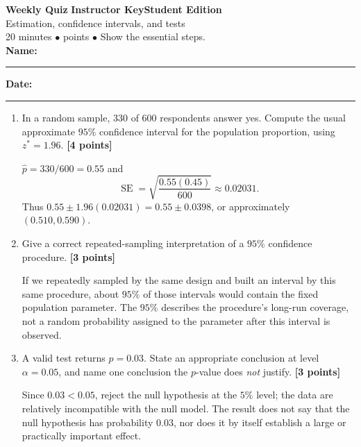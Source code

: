 \documentclass[11pt]{article}
\newcounter{quiznum}
\newcommand{\edition}{\ifanswers Instructor Key\else Student Edition\fi}
\newcommand{\points}[1]{\hfill{\small\color{rose}\textbf{[#1 points]}}}
\newcommand{\quizheading}[1]{%
  \clearpage\stepcounter{quiznum}%
  \begin{tcolorbox}[
    enhanced,colback=paper,colframe=indigo,boxrule=1.1pt,arc=2mm,
    left=4mm,right=4mm,top=2.5mm,bottom=2.5mm,
    borderline west={4pt}{0pt}{violet}]
    {\Large\bfseries\color{indigo}Weekly Quiz \thequiznum}\hfill
    {\bfseries\color{violet}\edition}\\[-1pt]
    {\large\color{ink}#1}\\[2pt]
    {\small\color{muted}20 minutes \quad $\bullet$ \quad 10 points \quad $\bullet$ \quad Show the essential steps.}
    \ifanswers\else
      \\[5pt]\textbf{Name:}\ \rule{0.48\linewidth}{0.4pt}\hfill
      \textbf{Date:}\ \rule{0.20\linewidth}{0.4pt}
    \fi
  \end{tcolorbox}
}
\begin{document}
\quizheading{Estimation, confidence intervals, and tests}
\begin{enumerate}
  \item In a random sample, $330$ of $600$ respondents answer yes. Compute the
  usual approximate $95\%$ confidence interval for the population proportion,
  using $z^*=1.96$. \points{4}
  \begin{solution}[1.55in]
    $\hat p=330/600=0.55$ and
    \[
      \operatorname{SE}=\sqrt{\frac{0.55(0.45)}{600}}\approx0.02031.
    \]
    Thus $0.55\pm1.96(0.02031)=0.55\pm0.0398$, or approximately
    $(0.510,0.590)$.
  \end{solution}

  \item Give a correct repeated-sampling interpretation of a $95\%$ confidence
  procedure. \points{3}
  \begin{solution}[1.35in]
    If we repeatedly sampled by the same design and built an interval by this same
    procedure, about $95\%$ of those intervals would contain the fixed population
    parameter. The $95\%$ describes the procedure's long-run coverage, not a random
    probability assigned to the parameter after this interval is observed.
  \end{solution}

  \item A valid test returns $p=0.03$. State an appropriate conclusion at level
  $\alpha=0.05$, and name one conclusion the $p$-value does \emph{not} justify.
  \points{3}
  \begin{solution}[1.3in]
    Since $0.03<0.05$, reject the null hypothesis at the $5\%$ level; the data are
    relatively incompatible with the null model. The result does not say that the
    null hypothesis has probability $0.03$, nor does it by itself establish a large
    or practically important effect.
  \end{solution}
\end{enumerate}
\end{document}
